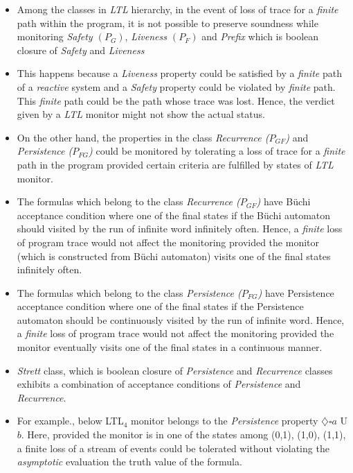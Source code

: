 \documentclass[]{article}
\begin{document}
\begin{itemize}
			\item Among the classes in \emph{LTL} hierarchy, in the event of loss of trace for a \emph{finite} path within the program, it is not possible to preserve soundness while monitoring \emph{Safety $(P_G)$}, \emph{Liveness $(P_F)$} and \emph{Prefix} which is boolean closure of \emph{Safety} and \emph{Liveness}
			
			\item This happens because a \emph{Liveness} property could be satisfied by a \emph{finite} path of a \emph{reactive} system and a \emph{Safety} property could be violated by \emph{finite} path. This \emph{finite} path could be the path whose trace was lost. Hence, the verdict given by a \emph{LTL} monitor might not show the actual status.
			
			\item On the other hand, the properties in the class \emph{Recurrence ($P_{GF}$)} and \emph{Persistence ($P_{FG}$)} could be monitored by tolerating a loss of trace for a \emph{finite} path in the program provided certain criteria are fulfilled by states of \emph{LTL} monitor.
			
			\item The formulas which belong to the class \emph{Recurrence ($P_{GF}$)} have B\"{u}chi acceptance condition where one of the final states if the B\"{u}chi automaton should visited by the run of infinite word infinitely often. Hence, a \emph{finite} loss of program trace would not affect the monitoring provided the monitor (which is constructed from B\"{u}chi automaton) visits one of the final states infinitely often.
			
			\item The formulas which belong to the class \emph{Persistence ($P_{FG}$)} have Persistence acceptance condition where one of the final states if the Persistence automaton should be continuously visited by the run of infinite word. Hence, a \emph{finite} loss of program trace would not affect the monitoring provided the monitor eventually visits one of the final states in a continuous manner.
			
			\item \emph{Strett} class, which is boolean closure of \emph{Persistence} and \emph{Recurrence} classes exhibits a combination of acceptance conditions of \emph{Persistence} and \emph{Recurrence}. 	
			
			\item For example., below LTL$_4$ monitor belongs to the \emph{Persistence} property $\diamondsuit \square a$ U $b$. Here, provided the monitor is in one of the states among (0,1), (1,0), (1,1), a finite loss of a stream of events could be tolerated without violating the \emph{asymptotic} evaluation the truth value of the formula. 
			

\end{itemize}
\end{document}
